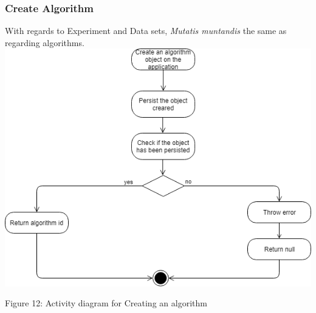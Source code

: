 	\subsubsection{Create Algorithm}
    \par With regards to Experiment and Data sets,
{ \textit{Mutatis muntandis} the same as regarding algorithms.} \newline \newline
    \includegraphics[width=\textwidth]{input_unit/images/create_algorithm_activity_diagram.png}
	\begin{center}
	    \small{Figure 12: Activity diagram for Creating an algorithm }
    \end{center}
    
